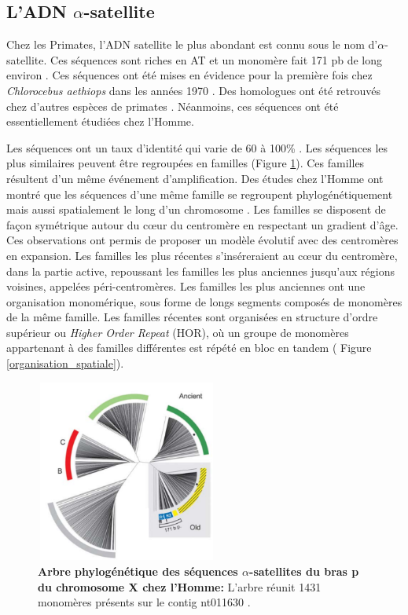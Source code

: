 \documentclass[12pt,a4paper]{article}
\begin{document}
\subsection{L'ADN $\alpha$-satellite}
Chez les Primates, l'ADN satellite le plus abondant est connu sous le nom d'$\alpha$-satellite. Ces séquences sont riches en AT et un monomère fait 171 pb de long environ \cite{Willard1991}. Ces séquences ont été mises en évidence pour la première fois chez \textit{Chlorocebus aethiops} dans les années 1970 \cite{Kurnit1974}. Des homologues ont été retrouvés chez d’autres espèces de primates \cite{Lee1997}. Néanmoins, ces séquences ont été essentiellement étudiées chez l’Homme.

Les séquences ont un taux d’identité qui varie de  60 à 100\% \cite{Alexandrov2001}. Les séquences les plus similaires peuvent être regroupées en familles (Figure \ref{shepelev}). Ces familles résultent d'un même événement d'amplification. Des études chez l'Homme ont montré que les séquences d'une même famille se regroupent phylogénétiquement mais aussi spatialement le long d'un chromosome \cite{Shepelev2009}. Les familles se disposent de façon symétrique autour du cœur du centromère en respectant un gradient d'âge.  Ces observations ont permis de proposer un modèle évolutif avec des centromères en expansion. Les familles les plus récentes s’inséreraient au cœur du centromère, dans la partie active, repoussant les familles les plus anciennes jusqu'aux régions voisines, appelées péri-centromères. Les familles les plus anciennes ont une organisation monomérique, sous forme de longs segments composés de monomères de la même famille. Les familles récentes sont organisées en structure d'ordre supérieur ou \textit{Higher Order Repeat} (HOR), où un groupe de monomères appartenant à des familles différentes est répété en bloc en tandem ( Figure \ref{organisation_spatiale}).

\begin{figure}
	\center
		\includegraphics[height=6cm, width=6cm]{img/shepelev.png}
		\caption{\textbf{Arbre phylogénétique des séquences $\alpha$-satellites du bras p du chromosome X chez l'Homme:} L’arbre réunit 1431 monomères présents sur le contig nt011630 \cite{Shepelev2009}.\label{shepelev}}
\end{figure}
\end{document}
